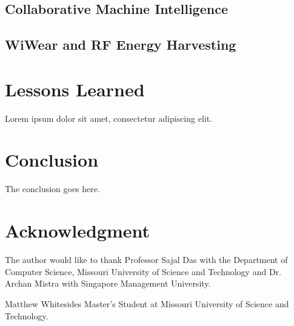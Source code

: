 \documentclass[journal,onecolumn]{IEEEtran}
\begin{document}
\subsection{Collaborative Machine Intelligence}



\subsection{WiWear and RF Energy Harvesting}

\section{Lessons Learned}

Lorem ipsum dolor sit amet, consectetur adipiscing elit.

\section{Conclusion}
The conclusion goes here.




\section*{Acknowledgment}
The author would like to thank Professor Sajal Das with the Department of Computer Science, Missouri University of Science and Technology and Dr. Archan Mistra with Singapore Management University.

\ifCLASSOPTIONcaptionsoff
  \newpage
\fi




\begin{IEEEbiographynophoto}{Matthew Whitesides}
  Master's Student at Missouri University of Science and Technology.
\end{IEEEbiographynophoto}

\end{document}
